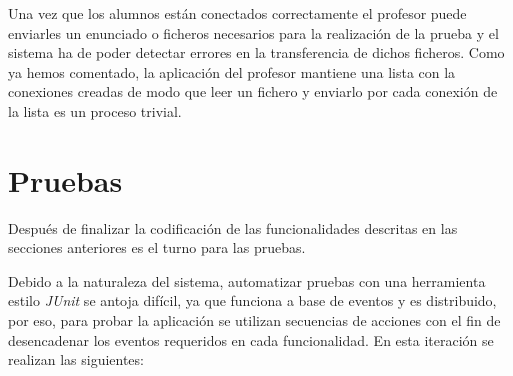 Una vez que los alumnos están conectados correctamente el profesor puede enviarles un enunciado o ficheros necesarios para la realización de la prueba y el sistema ha de poder detectar errores en la transferencia de dichos ficheros. Como ya hemos comentado, la aplicación del profesor mantiene una lista con la conexiones creadas de modo que leer un fichero y enviarlo por cada conexión de la lista es un proceso trivial.
\newline


\section{Pruebas}
\label{sec:iteracion1:pruebas}

Después de finalizar la codificación de las funcionalidades descritas en las secciones anteriores es el turno para las pruebas.
\newline

Debido a la naturaleza del sistema, automatizar pruebas con una herramienta estilo \emph{JUnit} se antoja difícil, ya que funciona a base de eventos\cite{EVENTOS:2010} y es distribuido, por eso, para probar la aplicación se utilizan secuencias de acciones con el fin de desencadenar los eventos requeridos en cada funcionalidad. En esta iteración se realizan las siguientes:

